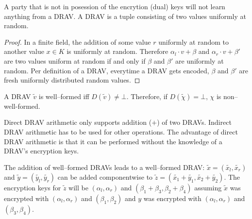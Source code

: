 \begin{lem}
  \label{lem:DRAV-random}

  A party that is not in posession of the encrytion (dual) keys will not learn
  anything from a DRAV. A DRAV is a tuple consisting of two values uniformly at
  random.

\end{lem}

\begin{proof}

  In a finite field, the addition of some value $r$ uniformly at random to
  another value $x \in K$ is uniformly at random. Therefore $\alpha_l \cdot v +
  \beta$ and $\alpha_r \cdot v + \beta'$ are two values uniform at random if and
  only if $\beta$ and $\beta'$ are uniformly at random. Per definition of a
  DRAV, everytime a DRAV gets encoded, $\beta$ and $\beta'$ are fresh uniformly
  distributed random values.

\end{proof}



A DRAV $\widetilde{v}$ is well--formed iff $D(\widetilde{v}) \neq \bot$.
Therefore, if $D(\widetilde{\chi}) = \bot$, $\chi$ is non--well-formed.


\label{sec:direct-DRAV-arithmetic}

Direct DRAV arithmetic only supports addition ($+$) of two DRAVs. Indirect DRAV
arithmetic has to be used for other operations. The advantage of direct DRAV
arithmetic is that it can be performed without the knowledge of a DRAV's
encryption keys.

\begin{lem}
  \label{lem:DRAV-add}

The addition of well--formed DRAVs leads to a well--formed DRAV:
$\widetilde{x} = (\widetilde{x_l}, \widetilde{x_r})$ and $\widetilde{y} =
(\widetilde{y_l}, \widetilde{y_r})$ can be added componentwise to $\widetilde{z}
= \left(\widetilde{x_1} + \widetilde{y_1}, \widetilde{x_2} +
\widetilde{y_2}\right)$. The encryption keys for $\widetilde{z}$ will be
$(\alpha_l, \alpha_r)$ and $(\beta_1 + \beta_3, \beta_2 + \beta_4)$ assuming
$\widetilde{x}$ was encrypted with $(\alpha_l, \alpha_r)$ and $(\beta_1,
\beta_2)$ and $y$ was encrypted with $(\alpha_l, \alpha_r)$ and $(\beta_3,
\beta_4)$.

\end{lem}

